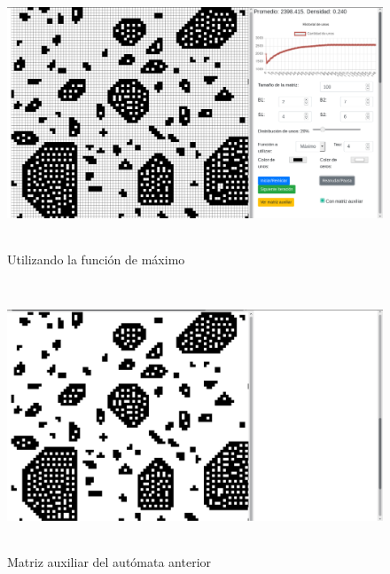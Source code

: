 \documentclass[12pt, titlepage]{article}
\begin{document}
\begin{figure}[H]
\begin{center}
 \includegraphics[width=15cm, height=8cm]{./img/2746-max.png}
 \caption{Utilizando la función de máximo}
 \label{fig:2746-max}
\end{center}
\end{figure}

\begin{figure}[H]
\begin{center}
 \includegraphics[width=15cm, height=8cm]{./img/2746-max-aux.png}
 \caption{Matriz auxiliar del autómata anterior}
 \label{fig:2746-max-aux}
\end{center}
\end{figure}
\end{document}

